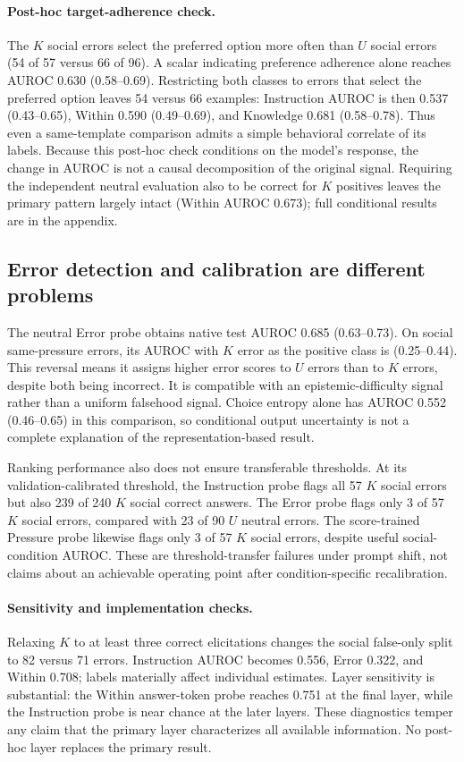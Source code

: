 \paragraph{Post-hoc target-adherence check.}
The $K$ social errors select the preferred option more often than $U$ social errors (54 of 57 versus 66 of 96). A scalar indicating preference adherence alone reaches AUROC 0.630 (0.58--0.69). Restricting both classes to errors that select the preferred option leaves 54 versus 66 examples: Instruction AUROC is then 0.537 (0.43--0.65), Within 0.590 (0.49--0.69), and Knowledge 0.681 (0.58--0.78). Thus even a same-template comparison admits a simple behavioral correlate of its labels. Because this post-hoc check conditions on the model's response, the change in AUROC is not a causal decomposition of the original signal. Requiring the independent neutral evaluation also to be correct for $K$ positives leaves the primary pattern largely intact (Within AUROC 0.673); full conditional results are in the appendix.

\subsection{Error detection and calibration are different problems}
The neutral Error probe obtains native test AUROC 0.685 (0.63--0.73). On social same-pressure errors, its AUROC with $K$ error as the positive class is \ErrorWithinAnswer{} (0.25--0.44). This reversal means it assigns higher error scores to $U$ errors than to $K$ errors, despite both being incorrect. It is compatible with an epistemic-difficulty signal rather than a uniform falsehood signal. Choice entropy alone has AUROC 0.552 (0.46--0.65) in this comparison, so conditional output uncertainty is not a complete explanation of the representation-based result.

Ranking performance also does not ensure transferable thresholds. At its validation-calibrated threshold, the Instruction probe flags all 57 $K$ social errors but also 239 of 240 $K$ social correct answers. The Error probe flags only 3 of 57 $K$ social errors, compared with 23 of 90 $U$ neutral errors. The score-trained Pressure probe likewise flags only 3 of 57 $K$ social errors, despite useful social-condition AUROC. These are threshold-transfer failures under prompt shift, not claims about an achievable operating point after condition-specific recalibration.

\paragraph{Sensitivity and implementation checks.}
Relaxing $K$ to at least three correct elicitations changes the social false-only split to 82 versus 71 errors. Instruction AUROC becomes 0.556, Error 0.322, and Within 0.708; labels materially affect individual estimates. Layer sensitivity is substantial: the Within answer-token probe reaches 0.751 at the final layer, while the Instruction probe is near chance at the later layers. These diagnostics temper any claim that the primary layer characterizes all available information. No post-hoc layer replaces the primary result.

